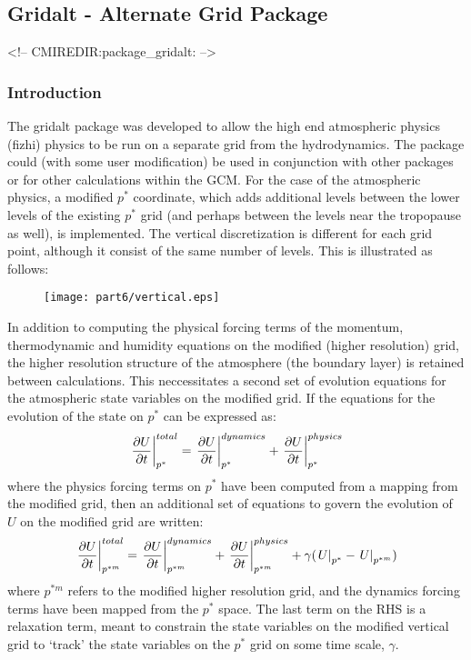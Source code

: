 \subsection{Gridalt - Alternate Grid Package}
\label{sec:pkg:gridalt}
\begin{rawhtml}
<!-- CMIREDIR:package_gridalt: -->
\end{rawhtml}

\subsubsection {Introduction} 

The gridalt package was developed to allow the high end atmospheric physics 
(fizhi) physics to be run on a separate grid from the hydrodynamics. The package
could (with some user modification) be used in conjunction with other packages 
or for other calculations within the GCM. For the case of the atmospheric 
physics, a modified $p^*$ coordinate, which adds additional levels between
the lower levels of the existing $p^*$ grid (and perhaps between the levels near 
the tropopause as well), is implemented. The vertical discretization is
different for each grid point, although it consist of the same number of 
levels. This is illustrated as follows:
\begin{figure}[htbp]
\vspace*{-0.4in}
\begin{center}
\texttt{[image: part6/vertical.eps]}
\end{center}
\end{figure}

\vspace*{-0.5in}
In addition to computing the physical forcing terms of the momentum,
thermodynamic and humidity equations on the modified (higher resolution)
grid, the higher resolution structure of the atmosphere (the boundary
layer) is retained between calculations. This neccessitates a second 
set of evolution equations for the atmospheric state variables on the 
modified grid. If the equations for the evolution of the state
on $p^*$ can be expressed as:
\[
\left . {\partial U \over {\partial t}} \right |_{p^*}^{total} = 
\left . {\partial U \over {\partial t}} \right |_{p^*}^{dynamics} + 
\left . {\partial U \over {\partial t}} \right |_{p^*}^{physics}
\]
where the physics forcing terms on $p^*$ have been computed from a
mapping from the modified grid, then an additional set of equations
to govern the evolution of $U$ on the modified grid are written:
\[
\left . {\partial U \over {\partial t}} \right |_{p^{*m}}^{total} = 
\left . {\partial U \over {\partial t}} \right |_{p^{*m}}^{dynamics} + 
\left . {\partial U \over {\partial t}} \right |_{p^{*m}}^{physics} +
\gamma ({\left . U \right |_{p^*}} - {\left . U \right |_{p^{*m}}})
\]
where $p^{*m}$ refers to the modified higher resolution grid, and
the dynamics forcing terms have been mapped from the $p^*$ space.
The last term on the RHS is a relaxation term, meant to constrain
the state variables on the modified vertical grid to `track' the
state variables on the $p^*$ grid on some time scale, $\gamma$.

